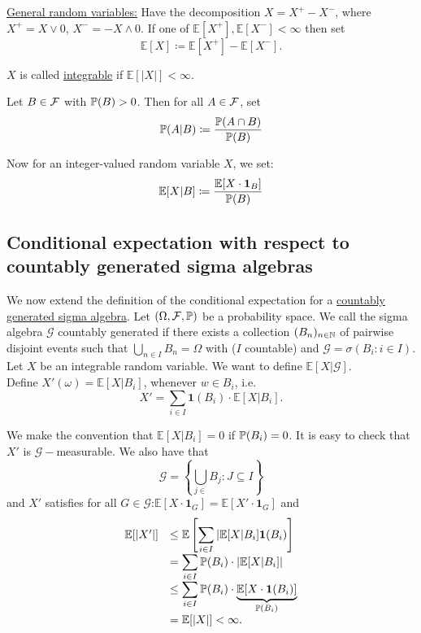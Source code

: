 \documentclass{article}
\begin{document}
\underline{General random variables:} Have the decomposition $ X = X^{+}-X^{-} $, where $ X^{+} = X\lor 0$, $X^{-}=-X\land 0 $. If one of $ \mathbb{E}[X^{+}], \mathbb{E}[X^{-}]  <\infty $ then set 
\[
	\mathbb{E}[X]\coloneqq \mathbb{E}[X^{+}]-\mathbb{E}[X^{-}].  
\]

\begin{boxdef}\label{def: integrable rv}
	$ X $ is called \underline{integrable} if $ \mathbb{E}[|X|]<\infty $.
\end{boxdef}

\begin{boxdef}\label{def: cond prob event}
Let $ B\in \mathcal{F} $ with $ \mathbb{P}(B)>0 $. Then for all $ A\in \mathcal{F} $, set 
\[
\mathbb{P}(A|B)\coloneqq \frac{\mathbb{P}(A\cap B)}{\mathbb{P}(B)}
\] 

\end{boxdef}


Now for an integer-valued random variable $ X $, we set:
\[
	\mathbb{E}[X|B]\coloneqq \frac{\mathbb{E}[X\cdot \mathbf{1}_{B}]}{\mathbb{P}(B)}
\]


\subsection{Conditional expectation with respect to countably generated sigma algebras}

We now extend the definition of the conditional expectation for a \underline{countably generated sigma algebra}. Let $ (\Omega, \mathcal{F}, \mathbb{P}) $ be a probability space. We call the sigma algebra $\mathcal{G} $ countably generated if there exists a collection $ (B_{n})_{n\in \mathbb{N}} $ of pairwise disjoint events such that $\displaystyle\bigcup_{n\in I}B_{n} = \Omega$ with ($ I $ countable) and $\mathcal{ G} = \sigma(B_{i}:i\in I)$.\\ 

Let $X$ be an integrable random variable. We want to define $\mathbb{E}[X|\mathcal{G}]$.\\ 

Define $X'(\omega) = \mathbb{E}[X|B_{i}]$, whenever $w\in B_{i}$, i.e. 
\[
	X' =\displaystyle\sum_{i\in I}\mathbf{1}(B_{i})\cdot\mathbb{E}[X|B_{i}]. 
\]

We make the convention that $\mathbb{E}[X|B_{i}] = 0$ if $\mathbb{P}(B_{i}) = 0$. It is easy to check that $X'$ is $\mathcal{G}-$measurable. We also have that 
\[
\mathcal{G}  = \left\{\displaystyle\bigcup_{j\in } B_{j}: J\subseteq I \right\}
\]
and $X'$ satisfies for all $ G\in\mathcal{G}$:$\mathbb{E}[X\cdot\mathbf{1}_{G}]=\mathbb{E}[X'\cdot\mathbf{1}_{G}] $ and 
\[\begin{array}{ll}
	\mathbb{E}[|X'|] &\leq\mathbb{E} \left[\displaystyle\sum_{i\in I}|\mathbb{E}[X|B_{i}]\mathbf{1}(B_{i})  \right] \\
			 &=\displaystyle\sum_{i \in I}\mathbb{P}(B_{i})\cdot \left|\mathbb{E}[X|B_{i}] \right|\\ 
			 &\leq\displaystyle\sum_{i\in I}\mathbb{P}(B_{i})\cdot \underbrace{\mathbb{E}[X\cdot\mathbf{1}(B_{i})]}_{\mathbb{P}(B_{i})}\\ 
			 &=\mathbb{E}[|X|]<\infty.
\end{array}
\]
\end{document}
